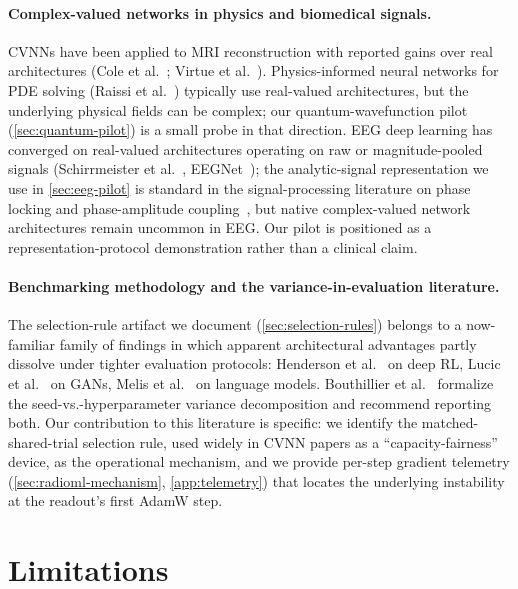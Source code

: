 \documentclass{article}
\providecommand{\Cref}[1]{\autoref{#1}}
\begin{document}
\paragraph{Complex-valued networks in physics and biomedical signals.}
CVNNs have been applied to MRI reconstruction with reported gains
over real architectures (Cole et al.~\cite{cole2021analysis}; Virtue
et al.~\cite{virtue2017better}). Physics-informed neural networks for
PDE solving (Raissi et al.~\cite{raissi2019pinns}) typically use
real-valued architectures, but the underlying physical fields can
be complex; our quantum-wavefunction pilot
(\Cref{sec:quantum-pilot}) is a small probe in that direction. EEG
deep learning has converged on real-valued architectures operating
on raw or magnitude-pooled signals (Schirrmeister et
al.~\cite{schirrmeister2017deep}, EEGNet~\cite{lawhern2018eegnet});
the analytic-signal representation we use in
\Cref{sec:eeg-pilot} is standard in the signal-processing literature
on phase locking and phase-amplitude
coupling~\cite{tort2010measuring}, but native complex-valued network
architectures remain uncommon in EEG. Our pilot is positioned as a
representation-protocol demonstration rather than a clinical claim.

\paragraph{Benchmarking methodology and the variance-in-evaluation literature.}
The selection-rule artifact we document
(\Cref{sec:selection-rules}) belongs to a now-familiar family of
findings in which apparent architectural advantages partly dissolve
under tighter evaluation protocols: Henderson et
al.~\cite{henderson2018deep} on deep RL, Lucic et
al.~\cite{lucic2018gans} on GANs, Melis et
al.~\cite{melis2018state} on language models. Bouthillier et
al.~\cite{bouthillier2021accounting} formalize the seed-vs.-hyperparameter
variance decomposition and recommend reporting both. Our
contribution to this literature is specific: we identify the
matched-shared-trial selection rule, used widely in CVNN papers as a
``capacity-fairness'' device, as the operational mechanism, and we
provide per-step gradient telemetry
(\Cref{sec:radioml-mechanism}, \Cref{app:telemetry}) that locates the
underlying instability at the readout's first AdamW step.

\section{Limitations}
\label{sec:limitations}
\end{document}
